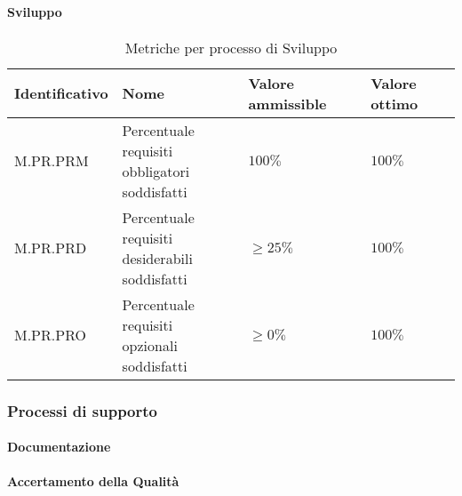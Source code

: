 \paragraph{Sviluppo}
\begin{table}[H]
    \centering
    \begin{tabular}{| l | l | l | l |}
    \hline
    \textbf{Identificativo} & 
    \textbf{Nome} &
    \textbf{Valore ammissible} &
    \textbf{Valore ottimo}\\
    \hline
        M.PR.PRM & \makecell{Percentuale requisiti \\ obbligatori soddisfatti} & $100\%$ & $100\%$ \\
    \hline
        M.PR.PRD & \makecell{Percentuale requisiti \\ desiderabili soddisfatti} & $\geq 25\%$ & $100\%$ \\
    \hline    
        M.PR.PRO & \makecell{Percentuale requisiti \\ opzionali soddisfatti} & $\geq 0\%$ & $100\%$ \\
    \hline
\end{tabular}
\caption{Metriche per processo di Sviluppo}
\label{tab:metriche_sviluppo} 
\end{table}

\subsubsection{Processi di supporto}
\paragraph{Documentazione}
\begin{table}[H]
    \centering
\caption{Metriche per processo di Documentazione}
\label{tab:metriche_documentazione} 
\end{table}

\paragraph{Accertamento della Qualità}
\begin{table}[H]
    \centering
\caption{Metriche per processo di Accertamento della Qualità}
\label{tab:metriche_accertamento} 
\end{table}

